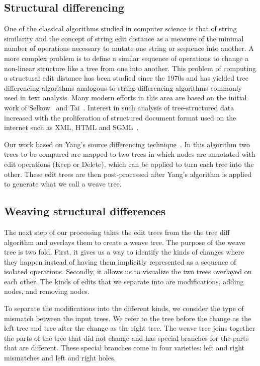 \subsection{Structural differencing}

One of the classical algorithms studied in computer science is that of string
similarity and the concept of string edit distance as a measure of the minimal
number of operations necessary to mutate one string or sequence into another.
A more complex problem is to define a similar sequence of operations to change
a non-linear structure like a tree from one into another.  This problem of
computing a structural edit distance has been studied since the  1970s and has
yielded tree differencing algorithms analogous to string differencing
algorithms commonly used in text analysis.  Many modern efforts in this area
are based on the initial work of Selkow~\cite{selkow77tree} and
Tai~\cite{tai79tree}.  Interest in such analysis of tree-structured data
increased with the proliferation of structured document format used on the
internet such as XML, HTML and SGML~\cite{chawathe96change}.

Our work based on Yang's source differencing technique~\cite{yang91diff}.
In this algorithm two trees to be compared are mapped to two trees in which
nodes are annotated with edit operations (Keep or Delete), which can be applied
to turn each tree into the other.  These edit trees are then post-processed
after Yang's algorithm is applied to generate what we call a weave tree.

\subsection{Weaving structural differences}

The next step of our processing takes the edit trees from the the tree diff
algorithm and overlays them to create a weave tree. The purpose of the weave
tree is two fold. First, it gives us a way to identify the kinds of changes
where they happen instead of having them implicitly represented as a sequence
of isolated operations. Secondly, it allows us to visualize the two trees
overlayed on each other. The kinds of edits that we separate into are
modifications, adding nodes, and removing nodes.

To separate the modifications into the different kinds, we consider the type of
mismatch between the input trees. We refer to the tree before the change as the
left tree and tree after the change as the right tree. The weave tree joins
together the parts of the tree that did not change and has special branches for
the parts that are different. These special branches come in four varieties:
left and right mismatches and left and right holes.

